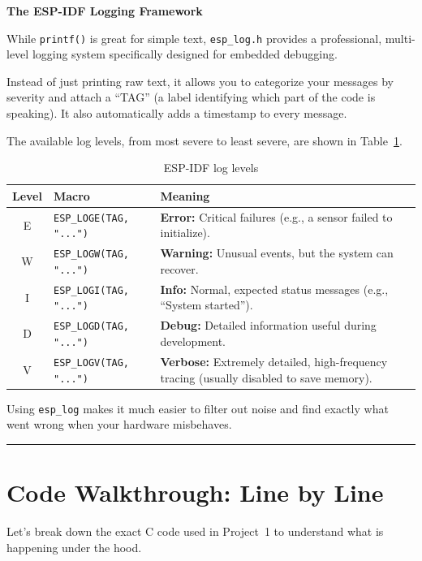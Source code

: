 \documentclass[11pt]{article}
\begin{document}
\textbf{The ESP-IDF Logging Framework}

While \texttt{printf()} is great for simple text, \texttt{esp\_log.h} provides a professional, multi-level logging system specifically designed for embedded debugging.

Instead of just printing raw text, it allows you to categorize your messages by severity and attach a ``TAG'' (a label identifying which part of the code is speaking). It also automatically adds a timestamp to every message.

The available log levels, from most severe to least severe, are shown in Table~\ref{tab:esp-log-levels}.

\begin{table}[!htbp]
\centering
\small
\renewcommand{\arraystretch}{1.4}
\begin{tabularx}{\textwidth}{@{}c l X@{}}
\toprule
\textbf{Level} & \textbf{Macro} & \textbf{Meaning} \\
\midrule
E & \texttt{ESP\_LOGE(TAG, "...")} & \textbf{Error:} Critical failures (e.g., a sensor failed to initialize). \\
W & \texttt{ESP\_LOGW(TAG, "...")} & \textbf{Warning:} Unusual events, but the system can recover. \\
I & \texttt{ESP\_LOGI(TAG, "...")} & \textbf{Info:} Normal, expected status messages (e.g., ``System started''). \\
D & \texttt{ESP\_LOGD(TAG, "...")} & \textbf{Debug:} Detailed information useful during development. \\
V & \texttt{ESP\_LOGV(TAG, "...")} & \textbf{Verbose:} Extremely detailed, high-frequency tracing (usually disabled to save memory). \\
\bottomrule
\end{tabularx}
\caption{ESP-IDF log levels}
\label{tab:esp-log-levels}
\end{table}

Using \texttt{esp\_log} makes it much easier to filter out noise and find exactly what went wrong when your hardware misbehaves.

\vspace{1em}
\noindent\rule{\textwidth}{0.4pt}
\vspace{1em}

\section*{Code Walkthrough: Line by Line}

Let's break down the exact C code used in Project~1 to understand what is happening under the hood.
\end{document}
